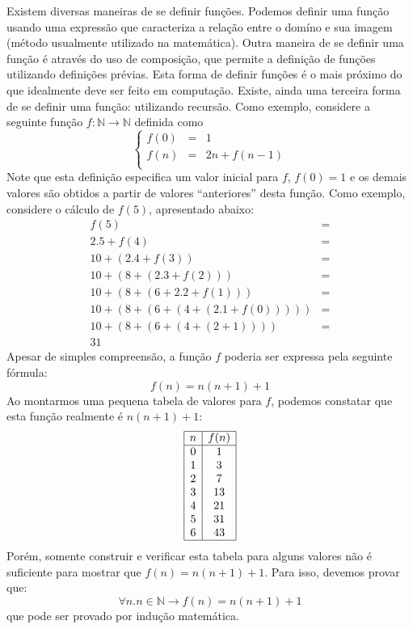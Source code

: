 Existem diversas maneiras de se definir funções. Podemos definir uma
função usando uma expressão que caracteriza a relação entre o domíno e
sua imagem (método usualmente utilizado na matemática). Outra maneira
de se definir uma função é através do uso de composição, que permite a
definição de funções utilizando definições prévias. Esta forma de
definir funções é o mais próximo do que idealmente deve ser feito em
computação. Existe, ainda uma terceira forma de se definir uma função:
utilizando recursão. Como exemplo,
considere a seguinte função $f : \mathbb{N} \to \mathbb{N}$ definida
como
\[
\left\{
\begin{array}{lcl}
  f(0) & = & 1 \\
  f(n) & = & 2n + f(n - 1)\\
\end{array}
\right .
\]
Note que esta definição especifica um valor inicial para $f$, $f(0) =
1$ e os demais valores são obtidos a partir de valores ``anteriores''
desta função. Como exemplo, considere o cálculo de $f(5)$, apresentado
abaixo:
\[
\begin{array}{lc}
f(5) & = \\
2.5 + f(4) & = \\
10 + (2.4 + f(3)) & = \\
10 + (8 + (2.3 + f(2))) & = \\
10 + (8 + (6 + 2.2 + f(1))) & = \\
10 + (8 + (6 + (4 + (2.1 + f(0))))) & = \\
10 + (8 + (6 + (4 + (2 + 1)))) & = \\
31
\end{array}
\]
Apesar de simples compreensão, a função $f$ poderia ser expressa pela
seguinte fórmula:
\[
f(n) = n(n + 1) + 1
\]
Ao montarmos uma pequena tabela de valores para $f$, podemos constatar
que esta função realmente é $n(n + 1) + 1$:
\[
\begin{array}{|c|c|}
  \hline
  n & f(n) \\ \hline
  0 &  1 \\
  1 &  3 \\
  2 &  7 \\
  3 & 13 \\
  4 & 21 \\
  5 & 31 \\
  6 & 43 \\ \hline
\end{array}
\]
Porém, somente construir e verificar esta tabela para alguns valores
não é suficiente para mostrar que $f(n) = n(n+1) + 1$. Para isso,
devemos provar que:
\[
\forall n. n\in\mathbb{N} \to f(n) = n(n+1) + 1
\]
que pode ser provado por indução matemática.

